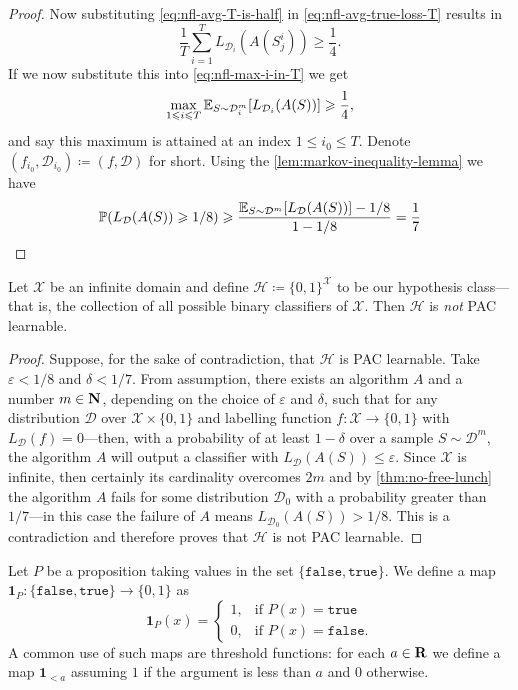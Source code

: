 \begin{proof}
Now substituting \cref{eq:nfl-avg-T-is-half} in \cref{eq:nfl-avg-true-loss-T}
results in
\[
\frac{1}{T} \sum_{i=1}^{T} L_{\mathcal{D}_i}(A(S_j^i)) \geq \frac{1}{4}.
\]
If we now substitute this into \cref{eq:nfl-max-i-in-T} we get
\[
\max_{1 \leqslant i \leqslant T} \operatorname{\mathbb{E}}_{S \sim \mathcal{D}_i^m}[L_{\mathcal{D}_i}(A(S))]
\geqslant \frac{1}{4},
\]
and say this maximum is attained at an index \(1 \leq i_0 \leq T\). Denote
\((f_{i_0}, \mathcal{D}_{i_0}) \coloneq (f, \mathcal{D})\) for short. Using the
\cref{lem:markov-inequality-lemma} we have
\[
\operatorname{\mathbb{P}}(L_{\mathcal{D}}(A(S)) \geqslant 1/8)
\geqslant \frac{\operatorname{\mathbb{E}}_{S \sim \mathcal{D}^m}[L_{\mathcal{D}}(A(S))] - 1/8}{1 - 1/8}
= \frac{1}{7}
\]
\end{proof}

\begin{corollary}
\label{cor:full-hypothesis-class-not-pac-learnable}
Let \(\mathcal{X}\) be an infinite domain and define
\(\mathcal{H} \coloneq \{0, 1\}^{\mathcal{X}}\) to be our hypothesis class---that is, the collection of all
possible binary classifiers of \(\mathcal{X}\). Then
\(\mathcal{H}\) is \emph{not} PAC learnable.
\end{corollary}

\begin{proof}
Suppose, for the sake of contradiction, that \(\mathcal{H}\) is PAC learnable. Take
\(\varepsilon < 1/8\) and \(\delta < 1/7\). From assumption, there exists an algorithm
\(A\) and a number \(m \in \mathbf{N}\), depending on the choice of \(\varepsilon\) and
\(\delta\), such that for any distribution \(\mathcal{D}\) over
\(\mathcal{X} \times \{0, 1\}\) and labelling function
\(f: \mathcal{X} \to \{0, 1\}\) with \(L_{\mathcal{D}}(f) = 0\)---then, with a probability of at least
\(1 - \delta\) over a sample \(S \sim \mathcal{D}^m\), the algorithm \(A\) will output a
classifier with \(L_{\mathcal{D}}(A(S)) \leq \varepsilon\). Since
\(\mathcal{X}\) is infinite, then certainly its cardinality overcomes \(2 m\) and by
\cref{thm:no-free-lunch} the algorithm \(A\) fails for some distribution
\(\mathcal{D}_0\) with a probability greater than \(1/7\)---in this case the failure of
\(A\) means \(L_{\mathcal{D}_0}(A(S)) > 1/8\). This is a contradiction and therefore
proves that \(\mathcal{H}\) is not PAC learnable.
\end{proof}

\begin{definition}
\label{def:threshold-function}
Let \(P\) be a proposition taking values in the set
\(\{\texttt{false}, \texttt{true}\}\). We define a map
\(\mathbf{1}_P: \{\texttt{false}, \texttt{true}\} \to \{0, 1\}\) as
\[
\mathbf{1}_P(x) =
\begin{cases}
  1, &\text{if } P(x) = \texttt{true} \\
  0, &\text{if } P(x) = \texttt{false}.
\end{cases}
\]
A common use of such maps are threshold functions: for each \(a \in \mathbf{R}\) we define
a map \(\mathbf{1}_{< a}\) assuming \(1\) if the argument is less than \(a\) and
\(0\) otherwise.
\end{definition}


